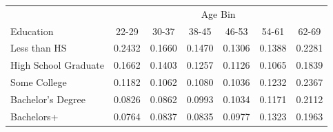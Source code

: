 \begin{tabular}{lcccccc}
\hline\hline
 & \multicolumn{6}{c}{Age Bin} \\
Education & 22-29 & 30-37 & 38-45 & 46-53 & 54-61 & 62-69 \\
\hline
Less than HS&0.2432&0.1660&0.1470&0.1306&0.1388&0.2281\\
High School Graduate&0.1662&0.1403&0.1257&0.1126&0.1065&0.1839\\
Some College&0.1182&0.1062&0.1080&0.1036&0.1232&0.2367\\
Bachelor's Degree&0.0826&0.0862&0.0993&0.1034&0.1171&0.2112\\
Bachelors+&0.0764&0.0837&0.0835&0.0977&0.1323&0.1963\\
\hline\hline
\end{tabular}
